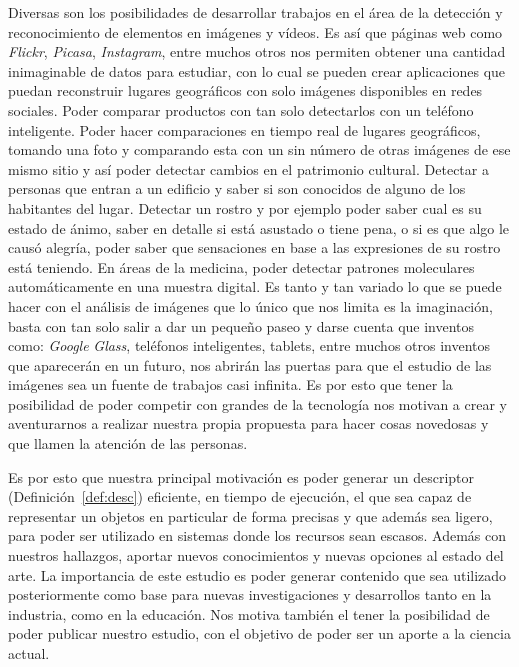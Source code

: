 Diversas son los posibilidades de desarrollar trabajos en el área de la detección y reconocimiento de elementos en imágenes y vídeos. Es así que páginas web como \textit{Flickr}, \textit{Picasa}, \textit{Instagram}, entre muchos otros nos permiten obtener una cantidad inimaginable de datos para estudiar, con lo cual se pueden crear aplicaciones que puedan reconstruir lugares geográficos con solo imágenes disponibles en redes sociales. Poder comparar productos con tan solo detectarlos con un teléfono inteligente. Poder hacer comparaciones en tiempo real de lugares geográficos, tomando una foto y comparando esta con un sin número de otras imágenes de ese mismo sitio y así poder detectar cambios en el patrimonio cultural. Detectar a personas que entran a un edificio y saber si son conocidos de alguno de los habitantes del lugar. Detectar un rostro y por ejemplo poder saber cual es su estado de ánimo, saber en detalle si está asustado o tiene pena, o si es que algo le causó alegría, poder saber que sensaciones en base a las expresiones de su rostro está teniendo. En áreas de la medicina, poder detectar patrones moleculares automáticamente en una muestra digital. Es tanto y tan variado lo que se puede hacer con el análisis de imágenes que lo único que nos limita es la imaginación, basta con tan solo salir a dar un pequeño paseo y darse cuenta que inventos como: \textit{Google} \textit{Glass}, teléfonos inteligentes, tablets, entre muchos otros inventos que aparecerán en un futuro, nos abrirán las puertas para que el estudio de las imágenes sea un fuente de trabajos casi infinita. Es por esto que tener la posibilidad de poder competir con grandes de la tecnología nos motivan a crear y aventurarnos a realizar nuestra propia propuesta para hacer cosas novedosas y que llamen la atención de las personas.

Es por esto que nuestra principal motivación es poder generar un descriptor (Definición~\ref{def:desc}) eficiente, en tiempo de ejecución, el que sea capaz de representar un objetos en particular de forma precisas y que además sea ligero, para poder ser utilizado en sistemas donde los recursos sean escasos. Además con nuestros hallazgos, aportar nuevos conocimientos y nuevas opciones al estado del arte. La importancia de este estudio es poder generar contenido que sea utilizado posteriormente como base para nuevas investigaciones y desarrollos tanto en la industria, como en la educación. Nos motiva también el tener la posibilidad de poder publicar nuestro estudio, con el objetivo de poder ser un aporte a la ciencia actual.

